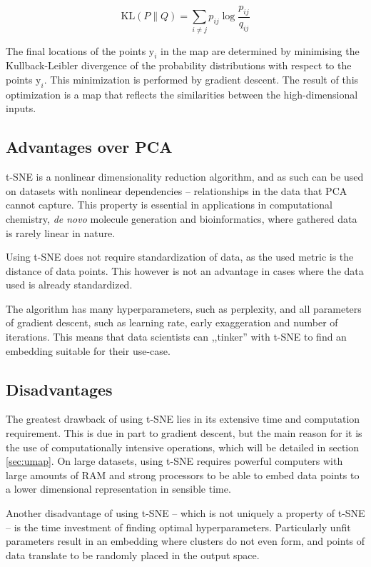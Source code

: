 \begin{equation}
	\label{eq:KLdiv}
 	\mathrm{KL} \left(P \parallel Q \right) = \sum_{i\neq j} p_{ij} \log{\frac{p_{ij}}{q_{ij}}}
\end{equation}

The final locations of the points $\mathrm{y}_i$ in the map are determined by minimising the Kullback-Leibler divergence of the probability distributions with respect to the points $\mathrm{y}_i$. This minimization is performed by gradient descent. The result of this optimization is a map that reflects the similarities between the high-dimensional inputs.

\subsection{Advantages over PCA}

t-SNE is a nonlinear dimensionality reduction algorithm, and as such can be used on datasets with nonlinear dependencies -- relationships in the data that PCA cannot capture. This property is essential in applications in computational chemistry, \textit{de novo} molecule generation and bioinformatics, where gathered data is rarely linear in nature.

Using t-SNE does not require standardization of data, as the used metric is the distance of data points. This however is not an advantage in cases where the data used is already standardized.

The algorithm has many hyperparameters, such as perplexity, and all parameters of gradient descent, such as learning rate, early exaggeration and number of iterations. This means that data scientists can ,,tinker'' with t-SNE to find an embedding suitable for their use-case.

\subsection{Disadvantages}

The greatest drawback of using t-SNE lies in its extensive time and computation requirement. This is due in part to gradient descent, but the main reason for it is the use of computationally intensive operations, which will be detailed in section \ref{sec:umap}. On large datasets, using t-SNE requires powerful computers with large amounts of RAM and strong processors to be able to embed data points to a lower dimensional representation in sensible time.

Another disadvantage of using t-SNE -- which is not uniquely a property of t-SNE -- is the time investment of finding optimal hyperparameters. Particularly unfit parameters result in an embedding where clusters do not even form, and points of data translate to be randomly placed in the output space.\cite{bib:distill}

